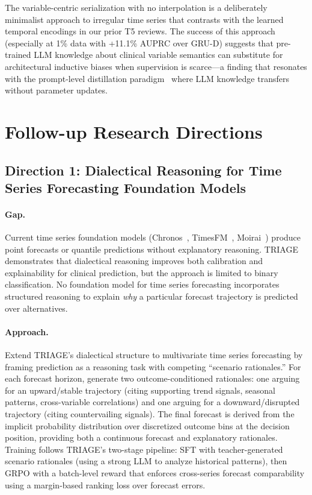 \documentclass[11pt,a4paper]{article}
\begin{document}
The variable-centric serialization with no interpolation is a deliberately minimalist approach to irregular time series that contrasts with the learned temporal encodings in our prior T5 reviews. The success of this approach (especially at 1\% data with +11.1\% AUPRC over GRU-D) suggests that pre-trained LLM knowledge about clinical variable semantics can substitute for architectural inductive biases when supervision is scarce---a finding that resonates with the prompt-level distillation paradigm~\cite{hsieh2026promptdistill} where LLM knowledge transfers without parameter updates.

\section{Follow-up Research Directions}

\subsection{Direction 1: Dialectical Reasoning for Time Series Forecasting Foundation Models}

\paragraph{Gap.} Current time series foundation models (Chronos~\cite{ansari2024chronos}, TimesFM~\cite{das2024timesfm}, Moirai~\cite{woo2024moirai}) produce point forecasts or quantile predictions without explanatory reasoning. TRIAGE demonstrates that dialectical reasoning improves both calibration and explainability for clinical prediction, but the approach is limited to binary classification. No foundation model for time series forecasting incorporates structured reasoning to explain \emph{why} a particular forecast trajectory is predicted over alternatives.

\paragraph{Approach.} Extend TRIAGE's dialectical structure to multivariate time series forecasting by framing prediction as a reasoning task with competing ``scenario rationales.'' For each forecast horizon, generate two outcome-conditioned rationales: one arguing for an upward/stable trajectory (citing supporting trend signals, seasonal patterns, cross-variable correlations) and one arguing for a downward/disrupted trajectory (citing countervailing signals). The final forecast is derived from the implicit probability distribution over discretized outcome bins at the decision position, providing both a continuous forecast and explanatory rationales. Training follows TRIAGE's two-stage pipeline: SFT with teacher-generated scenario rationales (using a strong LLM to analyze historical patterns), then GRPO with a batch-level reward that enforces cross-series forecast comparability using a margin-based ranking loss over forecast errors.
\end{document}
